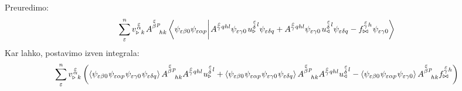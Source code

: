Preuredimo:
\begin{equation*}
   \sum^n_\varepsilon
   v^{\mkern 2mu \substack{\varepsilon \\[-0.5mm] \alpha \\[-0.2mm]}}_{\triangleright \mkern5mu k} \mkern2mu A^{\substack{\mkern2mu \varepsilon \\[0.15mm] \beta} \mkern2mu p}_{\mkern19mu hk}
   \braket{
      \psi_{ \varepsilon \beta 0} \psi_{\varepsilon \alpha p} }
   {
      \mkern2mu A^{\substack{\mkern2mu \varepsilon \\[-0.4mm] \gamma} \mkern2mu qhl}     \psi_{\varepsilon \gamma 0} \mkern2mu     u^{\substack{\mkern2mu \varepsilon \\[0.2mm] \delta} \mkern2mu l}_\triangleright     \psi_{\varepsilon \delta q}
      +
      A^{\substack{\mkern2mu \varepsilon \\[-0.4mm] \gamma} \mkern2mu qhl}    \psi_{\varepsilon \gamma 0} \mkern2mu     u^{\substack{\mkern2mu \varepsilon \\[0.2mm] \delta} \mkern2mu l}_\triangleleft \psi_{\varepsilon \delta q}
      -
      f^{\substack{\mkern2mu \varepsilon \\[-0.4mm] \gamma} \mkern2mu h}_{\bowtie} \mkern1mu    \psi_{\varepsilon \gamma 0} }
\end{equation*}
Kar lahko, postavimo izven integrala:
\begin{equation*}
   \sum^n_\varepsilon   v^{\mkern 2mu \substack{\varepsilon \\[-0.5mm] \alpha \\[-0.2mm]}}_{\triangleright \mkern5mu k} \left(
   \left\langle   \psi_{ \varepsilon \beta 0} \mkern1mu    \psi_{\varepsilon \alpha p} \mkern1mu    \psi_{\varepsilon \gamma 0} \mkern1mu    \psi_{\varepsilon \delta q}   \right\rangle
   A^{\substack{\mkern2mu \varepsilon \\[0.15mm] \beta} \mkern2mu p}_{\mkern19mu hk}    A^{\substack{\mkern2mu \varepsilon \\[-0.4mm] \gamma} \mkern2mu qhl} \mkern1mu     u^{\substack{\mkern2mu \varepsilon \\[0.2mm] \delta} \mkern2mu l}_\triangleright
   +
   \left\langle    \psi_{ \varepsilon \beta 0} \mkern1mu    \psi_{\varepsilon \alpha p} \mkern1mu    \psi_{\varepsilon \gamma 0} \mkern1mu    \psi_{\varepsilon \delta q}    \right\rangle
   A^{\substack{\mkern2mu \varepsilon \\[0.15mm] \beta} \mkern2mu p}_{\mkern19mu hk}    A^{\substack{\mkern2mu \varepsilon \\[-0.4mm] \gamma} \mkern2mu qhl}    u^{\substack{\mkern2mu \varepsilon \\[0.2mm] \delta} \mkern2mu l}_\triangleleft
   -
   \left\langle \psi_{ \varepsilon \beta 0} \mkern1mu    \psi_{\varepsilon \alpha p} \mkern1mu    \psi_{\varepsilon \gamma 0}    \right\rangle    A^{\substack{\mkern2mu \varepsilon \\[0.15mm] \beta} \mkern2mu p}_{\mkern19mu hk}    f^{\substack{\mkern2mu \varepsilon \\[-0.4mm] \gamma} \mkern2mu h}_{\bowtie}
   \right)
\end{equation*}
